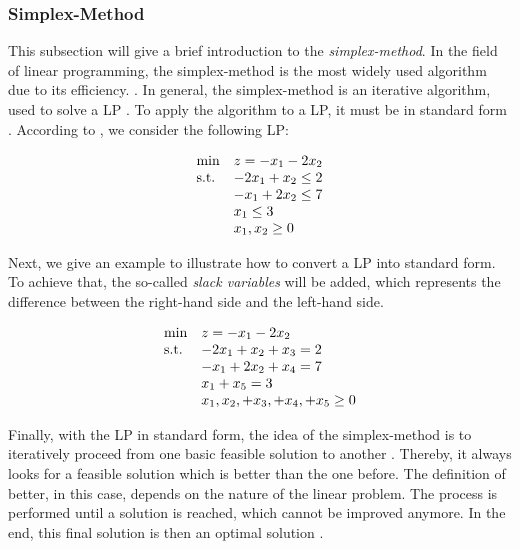 \subsubsection{Simplex-Method}
This subsection will give a brief introduction to the \textit{simplex-method}. 
In the field of linear programming, the simplex-method 
is the most widely used algorithm due to its  efficiency. .
In general, the simplex-method is an iterative algorithm, used to solve 
a LP . To apply the algorithm to a LP, 
it must be in standard form . According to , 
we consider the following LP:

\begin{equation*}
    \begin{array}{ll@{}ll}
        \text{min}  & \displaystyle z = -x_{1} - 2x_{2} &\\
        \text{s.t.}& \displaystyle - 2x_{1} + x_{2} \leq 2 &\\
                    & \displaystyle - x_{1} + 2x_{2} \leq 7 &\\
                    & \displaystyle  x_{1} \leq 3 &\\
                    &                        x_{1}, x_{2} \geq 0
    \end{array}
\end{equation*}

Next, we give an example to illustrate how to convert a LP into standard form.
To achieve that, the so-called \textit{slack variables} will be added, which represents the 
difference between the right-hand side and the left-hand side. 

\begin{equation*}
    \begin{array}{ll@{}ll}
        \text{min}  & \displaystyle z = -x_{1} - 2x_{2} &\\
        \text{s.t.}& \displaystyle - 2x_{1} + x_{2} + x_{3} = 2 &\\
                    & \displaystyle - x_{1} + 2x_{2} + x_{4} = 7 &\\
                    & \displaystyle  x_{1} + x_{5} = 3 &\\
                    &                        x_{1}, x_{2}, + x_{3}, + x_{4}, + x_{5} \geq 0
    \end{array}
\end{equation*}


Finally, with the LP in standard form, the idea of the simplex-method
is to iteratively proceed from one basic feasible solution to another .
Thereby, it always looks for a feasible solution which is better than the one before. 
The definition of better, in this case, depends on the nature of the linear problem. 
The process is performed until a solution is reached, which cannot 
be improved anymore. In the end, this final solution is then an optimal solution . 


\clearpage




